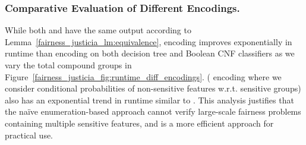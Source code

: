 \subsubsection{Comparative Evaluation of Different Encodings.}
While both {\justiciaenum} and {\justicialearn}  have the same output according to Lemma~\ref{fairness_justicia_lm:equivalence},  {\justicialearn} encoding  improves exponentially  in runtime  than {\justiciaenum} encoding on both decision tree and Boolean CNF classifiers as we vary the total compound groups in Figure~\ref{fairness_justicia_fig:runtime_diff_encodings}. {\justiciacond} ({\justiciaenum} encoding where we consider conditional probabilities of non-sensitive features w.r.t. sensitive groups) also has an exponential trend in runtime similar to {\justiciaenum}.  This analysis justifies that the na\"ive enumeration-based approach cannot verify large-scale fairness problems containing multiple sensitive features, and {\justicialearn} is a more efficient approach for practical use.









